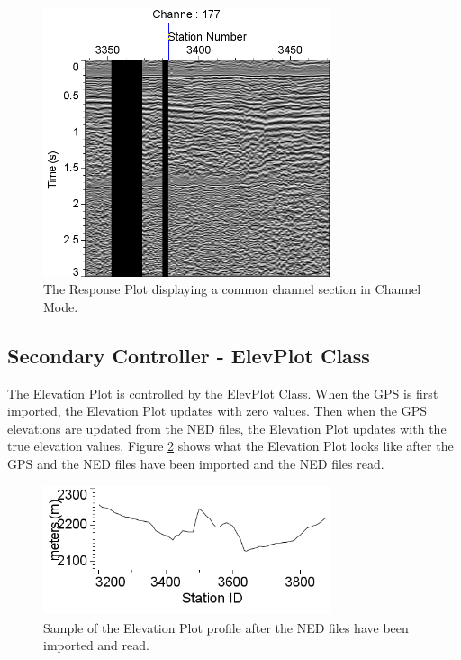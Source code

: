 \documentclass[12pt]{article}
\begin{document}
\begin{figure}[h]
\centering
\includegraphics[width=0.75\textwidth]{./figs/fig5.png}
\caption{The Response Plot displaying a common channel section in Channel Mode.}
\label{FIG:RPC}
\end{figure}

\subsection{Secondary Controller - ElevPlot Class}
\label{SUBSEC:EP}

The Elevation Plot is controlled by the ElevPlot Class. When the GPS is first imported, the Elevation Plot updates with zero values. Then when the GPS elevations are updated from the NED files, the Elevation Plot updates with the true elevation values. Figure \ref{FIG:EP} shows what the Elevation Plot looks like after the GPS and the NED files have been imported and the NED files read.

\begin{figure}[h]
\centering
\includegraphics[width=0.75\textwidth]{figs/fig2.png}
\caption{Sample of the Elevation Plot profile after the NED files have been imported and read.}
\label{FIG:EP}
\end{figure}
\end{document}
